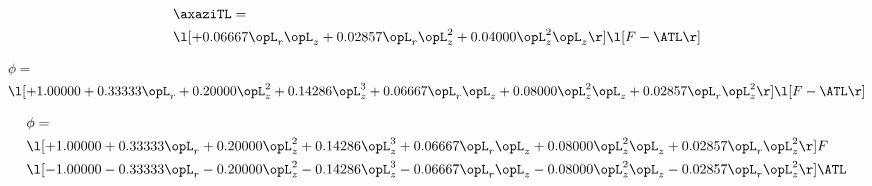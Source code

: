 \begin{alignat}{2} 
\label{eq:linaxaziTL_1} 
& \axaziTL = \\ 
& \l[ + 0.06667 \opL_r \opL_z + 0.02857 \opL_r \opL_z^{2} + 0.04000 \opL_z^{2} \opL_z  \r] \l[ F - \ATL \r] \nonumber \\ 
\end{alignat} 


\begin{alignat}{2} 
\label{eq:scalarFlux_1} 
& \phi = \\ 
& \l[ + 1.00000 + 0.33333 \opL_r + 0.20000 \opL_z^{2} + 0.14286 \opL_z^{3} + 0.06667 \opL_r \opL_z + 0.08000 \opL_z^{2} \opL_z + 0.02857 \opL_r \opL_z^{2}  \r] \l[ F - \ATL \r] \nonumber \\ 
\end{alignat} 


\begin{alignat}{2} 
\label{eq:scalarFlux_2} 
& \phi = \\ 
& \l[ + 1.00000 + 0.33333 \opL_r + 0.20000 \opL_z^{2} + 0.14286 \opL_z^{3} + 0.06667 \opL_r \opL_z + 0.08000 \opL_z^{2} \opL_z + 0.02857 \opL_r \opL_z^{2}  \r] F \nonumber \\ 
& \l[   -1.00000   -0.33333 \opL_r   -0.20000 \opL_z^{2}   -0.14286 \opL_z^{3}   -0.06667 \opL_r \opL_z   -0.08000 \opL_z^{2} \opL_z   -0.02857 \opL_r \opL_z^{2}  \r] \ATL \nonumber \\ 
\end{alignat} 


